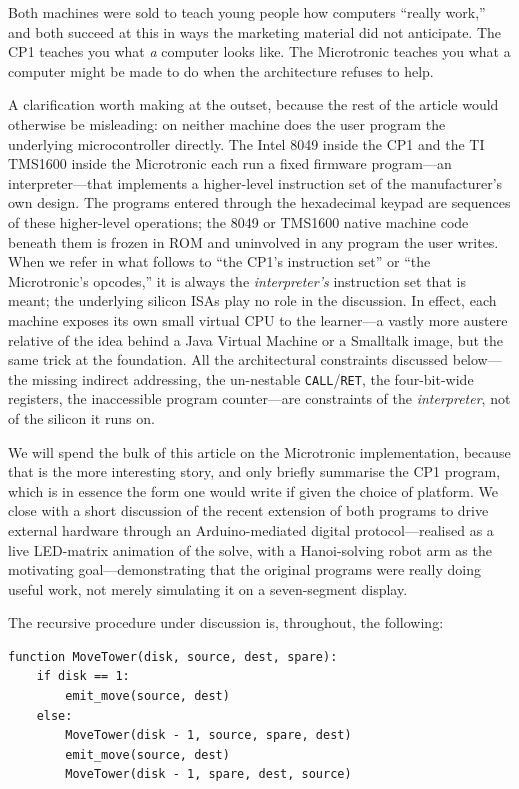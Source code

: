 \documentclass[11pt,a4paper]{article}
\begin{document}
Both machines were sold to teach young people how computers ``really
work,'' and both succeed at this in ways the marketing material did
not anticipate. The CP1 teaches you what \emph{a} computer looks like.
The Microtronic teaches you what a computer might be made to do when
the architecture refuses to help.

A clarification worth making at the outset, because the rest of the
article would otherwise be misleading: on neither machine does the
user program the underlying microcontroller directly. The Intel 8049
inside the CP1 and the TI TMS1600 inside the Microtronic each run a
fixed firmware program---an interpreter---that implements a
higher-level instruction set of the manufacturer's own design. The
programs entered through the hexadecimal keypad are sequences of
these higher-level operations; the 8049 or TMS1600 native machine
code beneath them is frozen in ROM and uninvolved in any program the
user writes. When we refer in what follows to ``the CP1's instruction
set'' or ``the Microtronic's opcodes,'' it is always the
\emph{interpreter's} instruction set that is meant; the underlying
silicon ISAs play no role in the discussion. In effect, each machine
exposes its own small virtual CPU to the learner---a vastly more
austere relative of the idea behind a Java Virtual Machine or a
Smalltalk image, but the same trick at the foundation. All the
architectural constraints discussed below---the missing indirect
addressing, the un-nestable \texttt{CALL}/\texttt{RET}, the
four-bit-wide registers, the inaccessible program counter---are
constraints of the \emph{interpreter}, not of the silicon it runs on.

We will spend the bulk of this article on the Microtronic
implementation, because that is the more interesting story, and only
briefly summarise the CP1 program, which is in essence the form one
would write if given the choice of platform. We close with a short
discussion of the recent extension of both programs to drive external
hardware through an Arduino-mediated digital protocol---realised as a
live LED-matrix animation of the solve, with a Hanoi-solving robot arm
as the motivating goal---demonstrating that the original programs were
really doing useful work, not merely simulating it on a seven-segment
display.

The recursive procedure under discussion is, throughout, the
following:

\begin{lstlisting}
function MoveTower(disk, source, dest, spare):
    if disk == 1:
        emit_move(source, dest)
    else:
        MoveTower(disk - 1, source, spare, dest)
        emit_move(source, dest)
        MoveTower(disk - 1, spare, dest, source)
\end{lstlisting}
\end{document}
